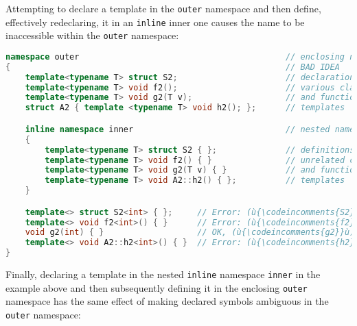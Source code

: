 \noindent Attempting to declare a template in the \texttt{outer} namespace and
then define, effectively redeclaring, it in an \texttt{inline} inner one
causes the name to be inaccessible within the \texttt{outer} namespace:

\begin{lstlisting}[language=C++]
namespace outer                                          // enclosing namespace
{                                                        // BAD IDEA
    template<typename T> struct S2;                      // declarations of
    template<typename T> void f2();                      // various class
    template<typename T> void g2(T v);                   // and function
    struct A2 { template <typename T> void h2(); };      // templates

    inline namespace inner                               // nested namespace
    {
        template<typename T> struct S2 { };              // definitions of
        template<typename T> void f2() { }               // unrelated class
        template<typename T> void g2(T v) { }            // and function
        template<typename T> void A2::h2() { };          // templates
    }

    template<> struct S2<int> { };     // Error: (ù{\codeincomments{S2}}ù) is ambiguous in (ù{\codeincomments{outer}}ù).
    template<> void f2<int>() { }      // Error: (ù{\codeincomments{f2}}ù) is ambiguous in (ù{\codeincomments{outer}}ù).
    void g2(int) { }                   // OK, (ù{\codeincomments{g2}}ù) is an overload definition.
    template<> void A2::h2<int>() { }  // Error: (ù{\codeincomments{h2}}ù) is ambiguous in (ù{\codeincomments{outer}}ù).
}
\end{lstlisting}
    
\noindent Finally, declaring a template in the nested \texttt{inline} namespace
\texttt{inner} in the example above and then subsequently defining it in
the enclosing \texttt{outer} namespace has the same effect of making
declared symbols ambiguous in the \texttt{outer} namespace:

